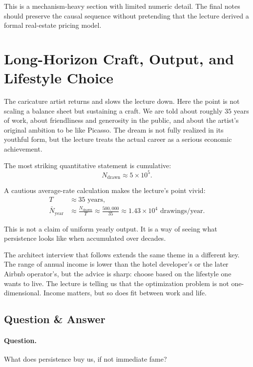 \begin{remark}
This is a mechanism-heavy section with limited numeric detail. The final notes should preserve the causal sequence without pretending that the lecture derived a formal real-estate pricing model.
\end{remark}

\section{Long-Horizon Craft, Output, and Lifestyle Choice}

The caricature artist returns and slows the lecture down. Here the point is not scaling a balance sheet but sustaining a craft. We are told about roughly \(35\) years of work, about friendliness and generosity in the public, and about the artist's original ambition to be like Picasso. The dream is not fully realized in its youthful form, but the lecture treats the actual career as a serious economic achievement.

The most striking quantitative statement is cumulative:
\begin{equation}
N_{\text{drawn}} \approx 5\times 10^5.
\end{equation}

A cautious average-rate calculation makes the lecture's point vivid:
\begin{align}
T &\approx 35 \text{ years},\\
\bar N_{\text{year}} &\approx \frac{N_{\text{drawn}}}{T}
\approx \frac{500{,}000}{35}
\approx 1.43\times 10^4 \text{ drawings/year}.
\end{align}

This is not a claim of uniform yearly output. It is a way of seeing what persistence looks like when accumulated over decades.

The architect interview that follows extends the same theme in a different key. The range of annual income is lower than the hotel developer's or the later Airbnb operator's, but the advice is sharp: choose based on the lifestyle one wants to live. The lecture is telling us that the optimization problem is not one-dimensional. Income matters, but so does fit between work and life.

\subsection{Question \& Answer}

\paragraph{Question.} What does persistence buy us, if not immediate fame?

